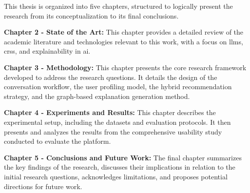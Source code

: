 This thesis is organized into five chapters, structured to logically present the research from its conceptualization to its final conclusions.

\begin{compactitem}[\textbullet]
    \item \textbf{Chapter 2 - State of the Art:} This chapter provides a detailed review of the academic literature and technologies relevant to this work, with a focus on \acp{llm}, \acp{crs}, and explainability in \ac{ai}.
    \item \textbf{Chapter 3 - Methodology:} This chapter presents the core research framework developed to address the research questions. It details the design of the conversation workflow, the user profiling model, the hybrid recommendation strategy, and the graph-based explanation generation method.
    \item \textbf{Chapter 4 - Experiments and Results:} This chapter describes the experimental setup, including the datasets and evaluation protocols. It then presents and analyzes the results from the comprehensive usability study conducted to evaluate the platform.
    \item \textbf{Chapter 5 - Conclusions and Future Work:} The final chapter summarizes the key findings of the research, discusses their implications in relation to the initial research questions, acknowledges limitations, and proposes potential directions for future work.
\end{compactitem}